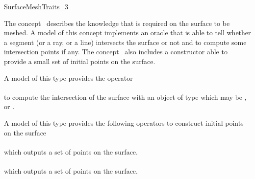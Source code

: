 

\begin{ccRefConcept}{SurfaceMeshTraits_3}


\ccDefinition
  
The concept \ccRefName\ describes the knowledge that is required on the
surface to be meshed. A model of this concept
implements an oracle that is able to tell whether a segment
(or a ray,  or a line) intersects the surface or not
and to compute some intersection
points if any. The concept \ccRefName\ also includes a constructor able  to provide
a small set of initial points on the surface.


\ccTypes

\ccGlue
{}
\ccGlue
{}
\ccGlue
{}
\ccGlue
{}


{A model of this type provides the operator \\
\\
to compute the intersection of the surface  
with an object of type  which may  be 
,  or  .}


{A model of this type provides the following operators
to construct initial points on the surface \\
\\
which outputs a set of points on the surface.
\\
 \\
which outputs a set of  points on the surface.}



\end{ccRefConcept}
